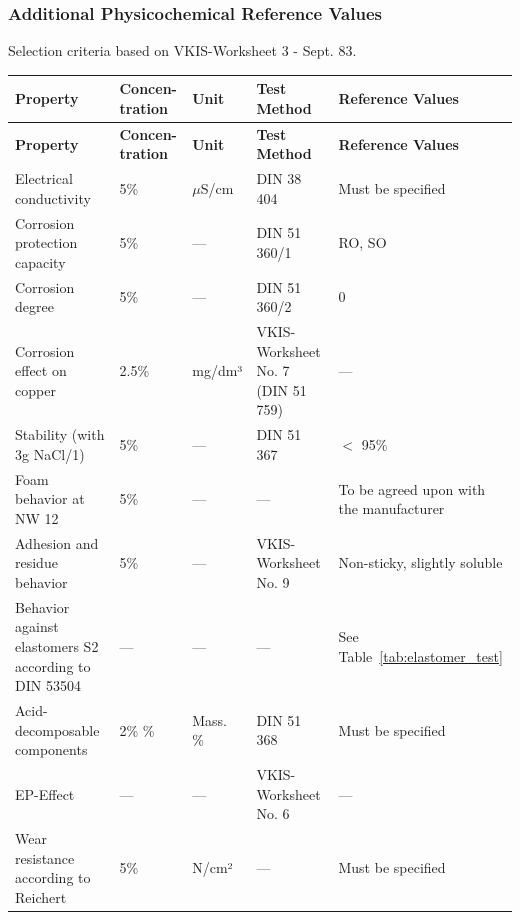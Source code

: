 \subsubsection*{Additional Physicochemical Reference Values}

Selection criteria based on VKIS-Worksheet 3 - Sept. 83.

\renewcommand{\arraystretch}{1.3}
\begin{longtable}{|p{5cm}|p{1.5cm}|p{3.5cm}|p{3cm}|p{2.5cm}|}
    \hline
    \textbf{Property} & \textbf{Concen-} \newline \textbf{tration} & \textbf{Unit} & \textbf{Test Method} & \textbf{Reference Values} \\
    \hline
    \endfirsthead

    \hline
    \textbf{Property} & \textbf{Concen-} \newline \textbf{tration} & \textbf{Unit} & \textbf{Test Method} & \textbf{Reference Values} \\
    \hline
    \endhead

    Electrical conductivity & 5\% & $\mu$S/cm & DIN 38 404 & Must be specified \\
    \hline
    Corrosion protection capacity & 5\% & --- & DIN 51 360/1 & RO, SO\footnotemark[3] \\
    \hline
    Corrosion degree & 5\% & --- & DIN 51 360/2 & 0 \\
    \hline
    Corrosion effect on copper\footnotemark[4] & 2.5\% & mg/dm³ & VKIS-Worksheet No. 7 \newline (DIN 51 759) & --- \\
    \hline
    Stability \newline (with 3g NaCl/1) & 5\% & --- & DIN 51 367 & $<$ 95\% \\
    \hline
    Foam behavior at NW 12 & 5\% & --- & --- & To be agreed upon with the manufacturer \\
    \hline
    Adhesion and residue behavior & 5\% & --- & VKIS-Worksheet No. 9 & Non-sticky, slightly soluble \\
    \hline
    Behavior against elastomers S2 according to DIN 53504\footnotemark[4] & --- & --- & --- & See Table~\ref{tab:elastomer_test} \\
    \hline
    Acid-decomposable components & 2\% \newline 10\% & Mass. \% & DIN 51 368 & Must be specified \\
    \hline
    EP-Effect & --- & --- & VKIS-Worksheet No. 6 & --- \\
    \hline
    Wear resistance according to Reichert & 5\% & N/cm² & --- & Must be specified \\
    \hline
\end{longtable}

